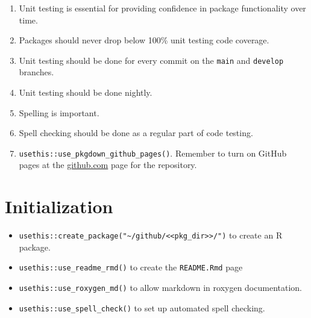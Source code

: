 \documentclass{article}
\begin{document}
\begin{enumerate}

  \item Unit testing is essential for providing confidence in package functionality over time.
  
  \item Packages should never drop below 100\% unit testing code coverage.
  
  \item Unit testing should be done for every commit on the \texttt{main} and \texttt{develop}
        branches.
		
  \item Unit testing should be done nightly.
  
  \item Spelling is important.
  
  \item Spell checking should be done as a regular part of code testing.
  
  \item \verb|usethis::use_pkgdown_github_pages()|. 
  		Remember to turn on GitHub pages at the \url{github.com} page for the repository.

\end{enumerate}


\section{Initialization}
\label{sec:initialiation}

\begin{itemize}
	
  \item \verb|usethis::create_package("~/github/<<pkg_dir>>/")| to create an R package.

  \item \verb|usethis::use_readme_rmd()| to create the \verb|README.Rmd| page

  \item \verb|usethis::use_roxygen_md()| to allow markdown in roxygen documentation.
  
  \item \verb|usethis::use_spell_check()| to set up automated spell checking.

\end{itemize}


\end{document}
